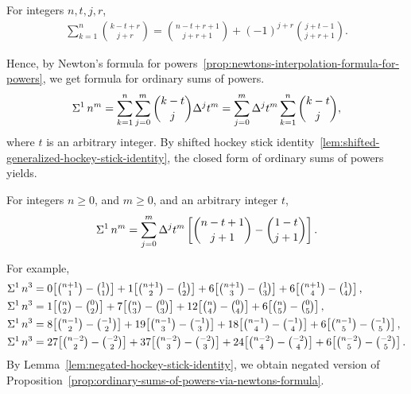 \begin{lemma} 
  \label{lem:negated-hockey-stick-identity}
  For integers $n,t,j,r$,
  \begin{align*}
    \sum_{k=1}^{n} \binom{k-t+r}{j+r}
    = \binom{n-t+r+1}{j+r+1} + (-1)^{j+r} \binom{j+t-1}{j+r+1}.
  \end{align*}
\end{lemma}

Hence, by Newton's formula for
powers~\eqref{prop:newtons-interpolation-formula-for-powers},
we get formula for ordinary sums of powers.
\begin{align*}
  \Sigma^{1}\,{n}^{m}
  = \sum_{k=1}^{n} \sum_{j=0}^{m} \binom{k-t}{j} \Delta^{j} t^m
  = \sum_{j=0}^{m} \Delta^{j} t^m  \sum_{k=1}^{n} \binom{k-t}{j},
\end{align*}
where $t$ is an arbitrary integer.
By shifted hockey stick
identity~\eqref{lem:shifted-generalized-hockey-stick-identity},
the closed form of ordinary sums of powers yields.

\begin{proposition}
  \label{prop:ordinary-sums-of-powers-via-newtons-formula}
  For integers $n\geq 0$, and $m\geq 0$, and an arbitrary integer $t$,
  \begin{align*}
    \Sigma^{1}\,{n}^{m} = \sum_{j=0}^{m} \Delta^{j} t^m
    \left[ \binom{n-t+1}{j+1} - \binom{1-t}{j+1} \right].
  \end{align*}
\end{proposition}

For example,
\begin{align*}
  \KnuthRFoldSum{1}{n}{3}
  &= 0\!\left[\tbinom{n+1}{1}-\tbinom{1}{1}\right]
  + 1\!\left[\tbinom{n+1}{2}-\tbinom{1}{2}\right]
  + 6\!\left[\tbinom{n+1}{3}-\tbinom{1}{3}\right]
  + 6\!\left[\tbinom{n+1}{4}-\tbinom{1}{4}\right], \\
  \KnuthRFoldSum{1}{n}{3}
  &= 1\!\left[\tbinom{n}{2}-\tbinom{0}{2}\right]
  + 7\!\left[\tbinom{n}{3}-\tbinom{0}{3}\right]
  + 12\!\left[\tbinom{n}{4}-\tbinom{0}{4}\right]
  + 6\!\left[\tbinom{n}{5}-\tbinom{0}{5}\right], \\
  \KnuthRFoldSum{1}{n}{3}
  &= 8\!\left[\tbinom{n-1}{2}-\tbinom{-1}{2}\right]
  + 19\!\left[\tbinom{n-1}{3}-\tbinom{-1}{3}\right]
  + 18\!\left[\tbinom{n-1}{4}-\tbinom{-1}{4}\right]
  + 6\!\left[\tbinom{n-1}{5}-\tbinom{-1}{5}\right], \\
  \KnuthRFoldSum{1}{n}{3}
  &= 27\!\left[\tbinom{n-2}{2}-\tbinom{-2}{2}\right]
  + 37\!\left[\tbinom{n-2}{3}-\tbinom{-2}{3}\right]
  + 24\!\left[\tbinom{n-2}{4}-\tbinom{-2}{4}\right]
  + 6\!\left[\tbinom{n-2}{5}-\tbinom{-2}{5}\right].
\end{align*}
By Lemma~\eqref{lem:negated-hockey-stick-identity},
we obtain negated version of
Proposition~\eqref{prop:ordinary-sums-of-powers-via-newtons-formula}.


